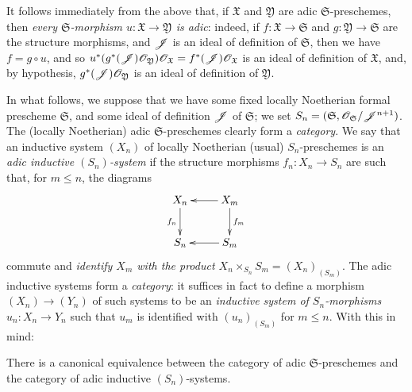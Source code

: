 It follows immediately from the above that, if $\mathfrak{X}$ and $\mathfrak{Y}$ are adic $\mathfrak{S}$-preschemes, then \emph{every $\mathfrak{S}$-morphism $u:\mathfrak{X}\to\mathfrak{Y}$ is adic}:
indeed, if $f:\mathfrak{X}\to\mathfrak{S}$ and $g:\mathfrak{Y}\to\mathfrak{S}$ are the structure morphisms, and $\mathscr{J}$ is an ideal of definition of $\mathfrak{S}$, then we have $f=g\circ u$, and so $u^*(g^*(\mathscr{J})\mathscr{O}_\mathfrak{Y})\mathscr{O}_\mathfrak{X}=f^*(\mathscr{J})\mathscr{O}_\mathfrak{X}$ is an ideal of definition of $\mathfrak{X}$, and, by hypothesis, $g^*(\mathscr{J})\mathscr{O}_\mathfrak{Y}$ is an ideal of definition of $\mathfrak{Y}$.

\begin{env}[10.12.2]
\label{I.10.12.2}
In what follows, we suppose that we have some fixed locally Noetherian formal prescheme $\mathfrak{S}$, and some ideal of definition $\mathscr{J}$ of $\mathfrak{S}$;
we set $S_n=(\mathfrak{S},\mathscr{O}_\mathfrak{S}/\mathscr{J}^{n+1})$.
The (locally Noetherian) adic $\mathfrak{S}$-preschemes clearly form a \emph{category}.
We say that an inductive system $(X_n)$ of locally Noetherian (usual) $S_n$-preschemes is an \emph{adic inductive $(S_n)$-system} if the structure morphisms $f_n:X_n\to S_n$ are such that, for $m\leq n$, the diagrams
\[
  \xymatrix{
    X_n \ar[d]_{f_n}
    & X_m \ar[l] \ar[d]^{f_m}\\
    S_n
    & S_m \ar[l]
  }
\]
commute and \emph{identify $X_m$ with the product $X_n\times_{S_n}S_m=(X_n)_{(S_m)}$}.
The adic inductive systems form a \emph{category}:
it suffices in fact to define a morphism $(X_n)\to(Y_n)$ of such systems to be an \emph{inductive system of $S_n$-morphisms $u_n:X_n\to Y_n$} such that $u_m$ is identified with $(u_n)_{(S_m)}$ for $m\leq n$.
With this in mind:
\end{env}

\begin{theorem}[10.12.3]
\label{I.10.12.3}
There is a canonical equivalence between the category of adic $\mathfrak{S}$-preschemes and the category of adic inductive $(S_n)$-systems.
\end{theorem}

